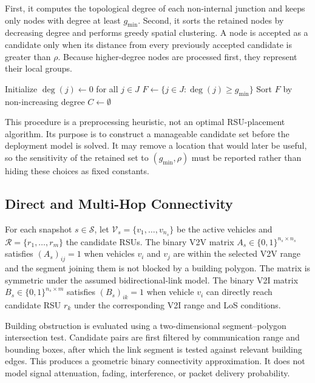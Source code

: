 \documentclass[engproc,proceedingpaper,submit,oneauthor]{Definitions/mdpi}
\begin{document}
First, it computes the topological degree of each non-internal junction and keeps only nodes with degree at least $g_{\min}$. Second, it sorts the retained nodes by decreasing degree and performs greedy spatial clustering. A node is accepted as a candidate only when its distance from every previously accepted candidate is greater than $\rho$. Because higher-degree nodes are processed first, they represent their local groups.

\begin{algorithm}[H]
\caption{Candidate RSU filtering by degree and greedy spatial clustering}\label{alg:candidates}
Initialize $\deg(j)\leftarrow0$ for all $j\in J$\;
$F\leftarrow\{j\in J:\deg(j)\ge g_{\min}\}$\;
Sort $F$ by non-increasing degree\;
$C\leftarrow\emptyset$\;
\;
\end{algorithm}

This procedure is a preprocessing heuristic, not an optimal RSU-placement algorithm. Its purpose is to construct a manageable candidate set before the deployment model is solved. It may remove a location that would later be useful, so the sensitivity of the retained set to $(g_{\min},\rho)$ must be reported rather than hiding these choices as fixed constants.

\subsection{Direct and Multi-Hop Connectivity}
For each snapshot $s\in\mathcal S$, let $\mathcal V_s=\{v_1,\ldots,v_{n_s}\}$ be the active vehicles and $\mathcal R=\{r_1,\ldots,r_m\}$ the candidate RSUs. The binary V2V matrix $A_s\in\{0,1\}^{n_s\times n_s}$ satisfies $(A_s)_{ij}=1$ when vehicles $v_i$ and $v_j$ are within the selected V2V range and the segment joining them is not blocked by a building polygon. The matrix is symmetric under the assumed bidirectional-link model. The binary V2I matrix $B_s\in\{0,1\}^{n_s\times m}$ satisfies $(B_s)_{ik}=1$ when vehicle $v_i$ can directly reach candidate RSU $r_k$ under the corresponding V2I range and LoS conditions.

Building obstruction is evaluated using a two-dimensional segment--polygon intersection test. Candidate pairs are first filtered by communication range and bounding boxes, after which the link segment is tested against relevant building edges. This produces a geometric binary connectivity approximation. It does not model signal attenuation, fading, interference, or packet delivery probability.
\end{document}
